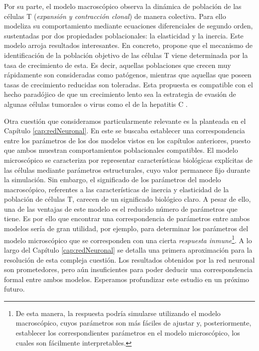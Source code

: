 Por su parte, el modelo macroscópico observa la dinámica de población de las células T (\textit{expansión y contracción clonal}) de manera colectiva. Para ello modeliza su comportamiento mediante ecuaciones diferenciales de segundo orden, sustentadas por dos propiedades poblacionales: la elasticidad y la inercia. Este modelo arroja resultados interesantes. En concreto, propone que el mecanismo de identificación de la población objetivo de las células T viene determinada por la tasa de crecimiento de esta. Es decir, aquellas poblaciones que crecen muy rápidamente son consideradas como patógenos, mientras que aquellas que poseen tasas de crecimiento reducidas son toleradas. Esta propuesta es compatible con el hecho paradójico de que un crecimiento lento sea la estrategia de evasión de algunas células tumorales o virus como el de la hepatitis C \citep{arias2015growth}. 

Otra cuestión que consideramos particularmente relevante es la planteada en el Capítulo \ref{cap:redNeuronal}. En este se buscaba establecer una correspondencia entre los parámetros de los dos modelos vistos en los capítulos anteriores, puesto que ambos muestran comportamientos poblacionales compatibles. El modelo microscópico se caracteriza por representar características biológicas explícitas de las células mediante parámetros estructurales, cuyo valor permanece fijo durante la simulación. Sin embargo, el significado de los parámetros del modelo macroscópico, referentes a las características de inercia y elasticidad de la población de células T, carecen de un significado biológico claro. A pesar de ello, una de las ventajas de este modelo es el reducido número de parámetros que tiene. Es por ello que encontrar una correspondencia de parámetros entre ambos modelos sería de gran utilidad, por ejemplo, para determinar los parámetros del modelo microscópico que se corresponden con una cierta \textit{respuesta inmune}\footnote{De esta manera, la respuesta podría simularse utilizando el modelo macroscópico, cuyos parámetros son más fáciles de ajustar y, posteriormente, establecer los correspondientes parámetros en el modelo microscópico, los cuales son fácilmente interpretables.}. A lo largo del Capítulo \ref{cap:redNeuronal} se detalla una primera aproximación para la resolución de esta compleja cuestión. Los resultados obtenidos por la red neuronal son prometedores, pero aún insuficientes para poder deducir una correspondencia formal entre ambos modelos. Esperamos profundizar este estudio en un próximo futuro.

